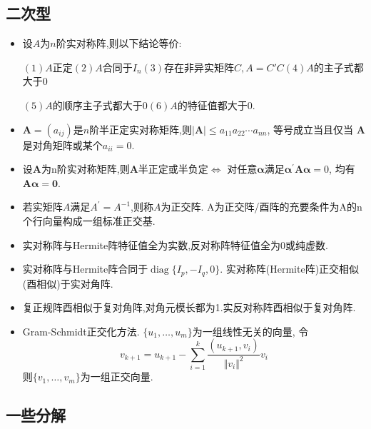 \documentclass[UTF8]{ctexart}
\begin{document}
\subsection{二次型}

\begin{itemize}
\item 设$A$为$n$阶实对称阵,则以下结论等价:\par
$(1)$$A$正定\quad $(2)$$A$合同于$I_n$\quad $(3)$存在非异实矩阵$C,A=C'C$\quad $(4)$$A$的主子式都大于$0$\par 
$(5)$$A$的顺序主子式都大于$0$\quad $(6)$$A$的特征值都大于$0$.

\item $\boldsymbol{A}=\left(a_{i j}\right)$是$n$阶半正定实对称矩阵,则$|\boldsymbol{A}| \leq a_{11} a_{22} \cdots a_{n n}$,
等号成立当且仅当 $\boldsymbol{A}$ 是对角矩阵或某个$a_{ii}=0$.

\item 设$\boldsymbol{A}$为n阶实对称矩阵,则$\boldsymbol{A}$半正定或半负定$\Leftrightarrow$
对任意$\boldsymbol{\alpha}$满足$\boldsymbol{\alpha}^{\prime} \boldsymbol{A} \boldsymbol{\alpha}=0$,
均有$\boldsymbol{A} \boldsymbol{\alpha}=\mathbf{0}$.

\item 若实矩阵$A$满足$A^{\prime}=A^{-1}$,则称$A$为正交阵. A为正交阵/酉阵的充要条件为A的n个行向量构成一组标准正交基.

\item 实对称阵与Hermite阵特征值全为实数,反对称阵特征值全为0或纯虚数.

\item 实对称阵与Hermite阵合同于$\operatorname{diag}\{I_p,-I_q,0\}$.
实对称阵(Hermite阵)正交相似(酉相似)于实对角阵.

\item 复正规阵酉相似于复对角阵,对角元模长都为1.实反对称阵酉相似于复对角阵.

\item Gram-Schmidt正交化方法.
$\{u_1,\dots,u_m\}$为一组线性无关的向量,
令$$v_{k+1}=u_{k+1}-\sum _{i=1}^k\frac{(u_{k+1},v_i)}{\Vert v_i\Vert^2}v_i$$
则$\{v_1,\dots,v_m\}$为一组正交向量.

\end{itemize}

\subsection{一些分解}
\end{document}
